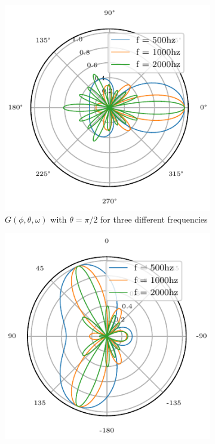 \begin{figure}[h]
	\centering
	\begin{subfigure}[t]{0.45\textwidth}
		\centering
		\includegraphics[width=\textwidth]{radial_1200_circ.pdf}
		\caption{\(G(\phi, \theta, \omega)\) with $\theta = \pi/2$ for three different frequencies}
		\label{ssl:fig:CircBmPhi}
	\end{subfigure}
	\hfill
	\begin{subfigure}[t]{0.45\textwidth}
		\centering
		\includegraphics[width=\textwidth]{radial_1200_circ_theta.pdf}

\end{subfigure}
\end{figure}
